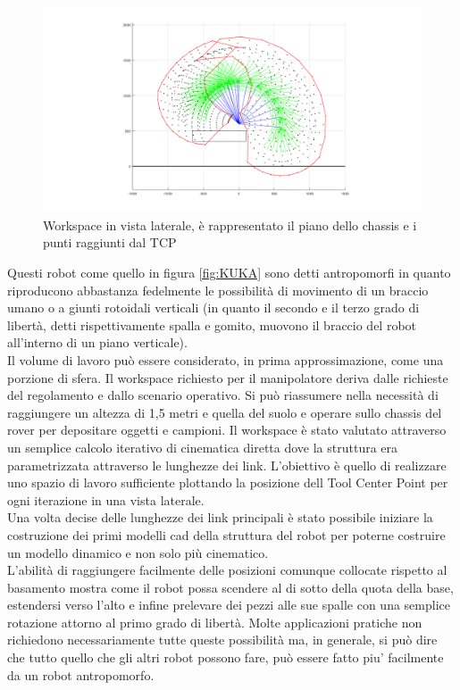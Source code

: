 \documentclass[%
corpo=11pt,
twoside,
 stile=classica,
oldstyle,
greek,%
]{toptesi}
\begin{document}
\begin{figure}
	\centering
	\includegraphics[width=\textwidth]{Plots/workspace.png}
	\caption{Workspace in vista laterale, è rappresentato il piano dello chassis e i punti raggiunti dal TCP}
	\label{fig:workspace}
\end{figure}
Questi robot come quello in figura \ref{fig:KUKA} sono detti antropomorfi in quanto riproducono abbastanza fedelmente le possibilità di movimento di un braccio umano o a giunti rotoidali verticali (in quanto il secondo e il terzo grado di libertà, detti rispettivamente spalla e gomito, muovono il braccio del robot all'interno di un piano verticale).\\ Il volume di lavoro può essere considerato, in prima approssimazione, come una porzione di sfera.
Il workspace richiesto per il manipolatore deriva dalle richieste del regolamento e dallo scenario operativo. Si può riassumere nella necessità di raggiungere un altezza di 1,5 metri e quella del suolo e operare sullo chassis del rover per depositare oggetti e campioni. 
Il workspace è stato valutato attraverso un semplice calcolo iterativo di cinematica diretta dove la struttura era parametrizzata attraverso le lunghezze dei link. L'obiettivo è quello di realizzare uno spazio di lavoro sufficiente plottando la posizione dell Tool Center Point per ogni iterazione in una vista laterale. \\
Una volta decise delle lunghezze dei link principali è stato possibile iniziare la costruzione dei primi modelli cad della struttura del robot per poterne costruire un modello dinamico e non solo più cinematico. 
\\
L'abilità di raggiungere facilmente delle posizioni comunque collocate rispetto al basamento mostra come il robot possa scendere al di sotto della quota della base, estendersi verso l'alto  e infine prelevare dei pezzi alle sue spalle con una semplice rotazione
attorno al primo grado di libertà.
Molte applicazioni pratiche non richiedono necessariamente tutte queste possibilità ma, in generale, si può dire che tutto quello che gli altri robot possono fare, può essere fatto piu' facilmente da un robot antropomorfo.
\end{document}
